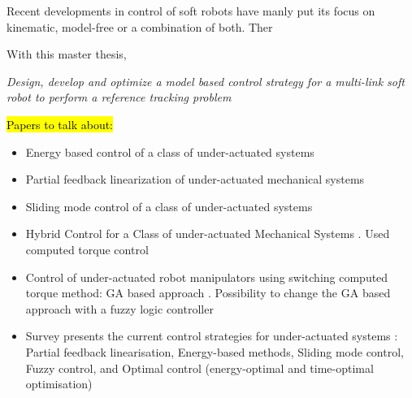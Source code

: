 Recent developments in control of soft robots have manly put its focus on kinematic, model-free or a combination of both. Ther


With this master thesis, 


\textit{Design, develop and optimize a model based control strategy for a multi-link soft robot to perform a reference tracking problem}










\hl{Papers to talk about:}

\begin{itemize}

    \item Energy based control of a class of under-actuated systems \cite{spong1996energy}
    \item Partial feedback linearization of under-actuated mechanical systems \cite{spong1994linear}
    \item Sliding mode control of a class of under-actuated systems \cite{xu2008sliding}
    \item Hybrid Control for a Class of under-actuated Mechanical Systems \cite{fierro1999hybrid}. Used computed torque control
    \item Control of under-actuated robot manipulators using switching
    computed torque method: GA based approach \cite{udawatta2003control}.  Possibility to change the GA based approach with a fuzzy logic controller \cite{udawatta2003controlfuzzy}
    \item Survey presents the current control strategies for under-actuated systems \cite{liu2013survey} : Partial feedback linearisation, Energy-based methods, Sliding mode control, Fuzzy control, and Optimal control (energy-optimal and time-optimal optimisation)

\end{itemize}